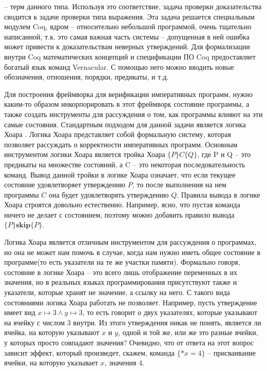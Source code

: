 -- терм данного типа. Используя это соответствие, задача проверки доказательства сводится к задаче проверки типа выражения. Эта задача
решается специальным модулем Coq, ядром -- относительно небольшой программой, очень тщательно написанной, т.к. это самая важная часть
системы -- допущенная в ней ошибка может привести к доказательствам неверных утверждений.
Для формализации внутри Coq математических концепций и спецификации ПО Coq предоставляет богатый язык команд Vernacular.
С помощью него можно вводить новые обозначения, отношения, порядки, предикаты, и т.д.
\par
Для построения фреймворка для верификации императивных программ, нужно каким-то образом инкорпорировать в этот фреймворк состояние программы,
а также создать инструменты для рассуждения о том, как программы влияют на эти самые состояния. Стандартным подходом для данной задачи
является логика Хоара \cite{Hoare}. Логика Хоара представляет собой формальную систему, которая позволяет рассуждать о корректности
императивных программ. Основным инструментом логики Хоара является тройка Хоара $\{P\}C\{Q\}$, где P и Q -- это предикаты на множестве состояний,
а C -- это некоторая последовательность команд. Вывод данной тройки в логике Хоара означает, что если текущее состояние удовлетворяет
утверждению $P$, то после выполнения на нем программы $C$ она будет удовлетворять утверждению $Q$. Правила вывода в логике Хоара
строятся довольно естественно. Например, ясно, что пустая команда ничего не делает с состоянием, поэтому можно добавить правило вывода
$\{P\}\textbf{skip}\{P\}$.
\par
Логика Хоара является отличным инструментом для рассуждения о программах, но она не может нам помочь в случае, когда нам нужно иметь
общее состояние в программе(то есть указатели на те же участки памяти). Формально говоря, состояние в логике Хоара -- это всего лишь
отображение переменных в их значения, но в реальных языках программирования присутствуют также и указатели, которые хранят не значение,
а ссылку на него. С такого вида состояниями логика Хоара работать не позволяет. Например, пусть утверждение имеет вид
$x \mapsto 3 \land y \mapsto 3$, то есть говорит о двух указателях, которые указывают на ячейку с числом $3$ внутри. Из этого утверждения
никак не понять, является ли ячейка, на которую указывают $x$ и $y$, одной и той же, или же это разные ячейки, у которых просто
совпадают значения? Очевидно, что от ответа на этот вопрос зависит эффект, который произведет, скажем, команда $\{*x = 4\}$ -- присваивание
ячейки, на которую указывает $x$, значения 4.
